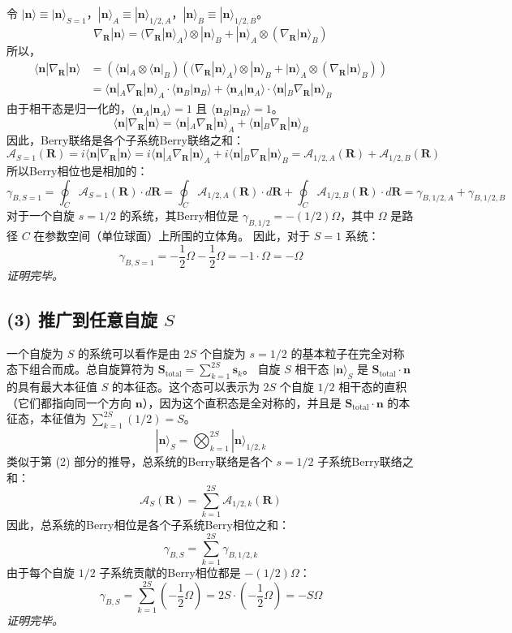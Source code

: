\documentclass[12pt, a4paper]{article}
\newcommand{\ket}[1]{| #1 \rangle}
\newcommand{\bra}[1]{\langle #1 |}
\newcommand{\braket}[2]{\langle #1 | #2 \rangle}
\newcommand{\nvec}{\mathbf{n}}
\newcommand{\Svec}{\mathbf{S}}
\newcommand{\svec}{\mathbf{s}}
\newcommand{\Rparam}{\mathbf{R}} %
\begin{document}
令 \(\ket{\nvec} \equiv \ket{\nvec}_{S=1}\)，\(\ket{\nvec}_A \equiv \ket{\nvec}_{1/2, A}\)，\(\ket{\nvec}_B \equiv \ket{\nvec}_{1/2, B}\)。
\[ \nabla_{\Rparam} \ket{\nvec} = (\nabla_{\Rparam} \ket{\nvec}_A) \otimes \ket{\nvec}_B + \ket{\nvec}_A \otimes (\nabla_{\Rparam} \ket{\nvec}_B) \]
所以，
\begin{align*}
\bra{\nvec} \nabla_{\Rparam} \ket{\nvec} &= (\bra{\nvec}_A \otimes \bra{\nvec}_B) \left( (\nabla_{\Rparam} \ket{\nvec}_A) \otimes \ket{\nvec}_B + \ket{\nvec}_A \otimes (\nabla_{\Rparam} \ket{\nvec}_B) \right) \\
&= \bra{\nvec}_A \nabla_{\Rparam} \ket{\nvec}_A \cdot \braket{\nvec_B}{\nvec_B} + \braket{\nvec_A}{\nvec_A} \cdot \bra{\nvec}_B \nabla_{\Rparam} \ket{\nvec}_B
\end{align*}
由于相干态是归一化的，\(\braket{\nvec_A}{\nvec_A} = 1\) 且 \(\braket{\nvec_B}{\nvec_B} = 1\)。
\[ \bra{\nvec} \nabla_{\Rparam} \ket{\nvec} = \bra{\nvec}_A \nabla_{\Rparam} \ket{\nvec}_A + \bra{\nvec}_B \nabla_{\Rparam} \ket{\nvec}_B \]
因此，Berry联络是各个子系统Berry联络之和：
\[ \mathcal{A}_{S=1}(\Rparam) = i \bra{\nvec} \nabla_{\Rparam} \ket{\nvec} = i \bra{\nvec}_A \nabla_{\Rparam} \ket{\nvec}_A + i \bra{\nvec}_B \nabla_{\Rparam} \ket{\nvec}_B = \mathcal{A}_{1/2, A}(\Rparam) + \mathcal{A}_{1/2, B}(\Rparam) \]
所以Berry相位也是相加的：
\[ \gamma_{B, S=1} = \oint_C \mathcal{A}_{S=1}(\Rparam) \cdot d\Rparam = \oint_C \mathcal{A}_{1/2, A}(\Rparam) \cdot d\Rparam + \oint_C \mathcal{A}_{1/2, B}(\Rparam) \cdot d\Rparam = \gamma_{B, 1/2, A} + \gamma_{B, 1/2, B} \]
对于一个自旋 \(s=1/2\) 的系统，其Berry相位是 \(\gamma_{B, 1/2} = -(1/2)\Omega\)，其中 \(\Omega\) 是路径 \(C\) 在参数空间（单位球面）上所围的立体角。
因此，对于 \(S=1\) 系统：
\[ \gamma_{B, S=1} = -\frac{1}{2}\Omega - \frac{1}{2}\Omega = -1 \cdot \Omega = -\Omega \]
\textit{证明完毕。}

\subsection*{(3) 推广到任意自旋 \(S\)}

一个自旋为 \(S\) 的系统可以看作是由 \(2S\) 个自旋为 \(s=1/2\) 的基本粒子在完全对称态下组合而成。总自旋算符为 \(\Svec_{\text{total}} = \sum_{k=1}^{2S} \svec_k\)。
自旋 \(S\) 相干态 \(\ket{\nvec}_S\) 是 \(\Svec_{\text{total}} \cdot \nvec\) 的具有最大本征值 \(S\) 的本征态。这个态可以表示为 \(2S\) 个自旋 \(1/2\) 相干态的直积（它们都指向同一个方向 \(\nvec\)），因为这个直积态是全对称的，并且是 \(\Svec_{\text{total}} \cdot \nvec\) 的本征态，本征值为 \(\sum_{k=1}^{2S} (1/2) = S\)。
\[ \ket{\nvec}_S = \bigotimes_{k=1}^{2S} \ket{\nvec}_{1/2, k} \]
类似于第 (2) 部分的推导，总系统的Berry联络是各个 \(s=1/2\) 子系统Berry联络之和：
\[ \mathcal{A}_S(\Rparam) = \sum_{k=1}^{2S} \mathcal{A}_{1/2, k}(\Rparam) \]
因此，总系统的Berry相位是各个子系统Berry相位之和：
\[ \gamma_{B, S} = \sum_{k=1}^{2S} \gamma_{B, 1/2, k} \]
由于每个自旋 \(1/2\) 子系统贡献的Berry相位都是 \(-(1/2)\Omega\)：
\[ \gamma_{B, S} = \sum_{k=1}^{2S} \left(-\frac{1}{2}\Omega\right) = 2S \cdot \left(-\frac{1}{2}\Omega\right) = -S\Omega \]
\textit{证明完毕。}
\end{document}
